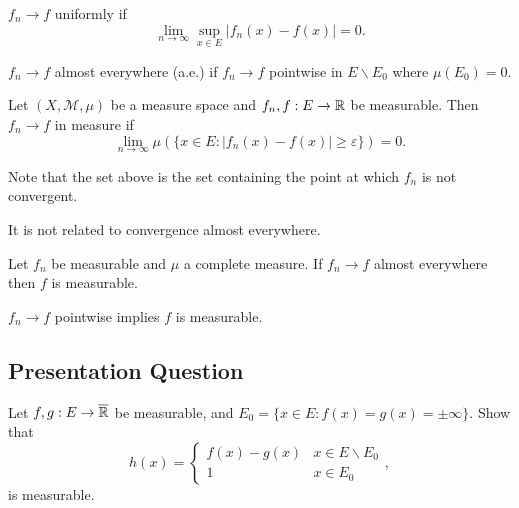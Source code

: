 \documentclass[class=book, crop=false]{standalone}
\begin{document}
        \begin{definition}
            $f_n \rightarrow f$ uniformly if
            \begin{equation*}
                \lim_{n \rightarrow \infty} \sup_{x \in E} |f_n(x) - f(x)| = 0.
            \end{equation*}
        \end{definition}

        \begin{definition}
            $f_n \rightarrow f$ almost everywhere (a.e.) if $f_n \rightarrow f$ pointwise in $E \backslash E_0$ where $\mu(E_0) = 0$.
        \end{definition}

        \begin{definition}
            Let $(X, \mathcal{M}, \mu)$ be a measure space and $f_n, f : E \rightarrow \mathbb{R}$ be measurable. Then $f_n \rightarrow f$ in measure if
            \begin{equation*}
                \lim_{n \rightarrow \infty} \mu(\{x \in E : |f_n(x) - f(x)| \geq \varepsilon\}) = 0.
            \end{equation*}
        \end{definition}
        \begin{remark}
            Note that the set above is the set containing the point at which $f_n$ is not convergent.
        \end{remark}
        \begin{remark}
            It is not related to convergence almost everywhere.
        \end{remark}

        \begin{theorem}
            Let $f_n$ be measurable and $\mu$ a complete measure. If $f_n \rightarrow f$ almost everywhere then $f$ is measurable.
        \end{theorem}
        \begin{corollary}
            $f_n \rightarrow f$ pointwise implies $f$ is measurable.
        \end{corollary}
        
        \subsection{Presentation Question}
        \begin{question}
            Let $f, g : E \rightarrow \overline{\mathbb{R}}$ be measurable, and $E_0 = \{x \in E : f(x) = g(x) = \pm\infty\}$. Show that
            \begin{equation*}
                h(x) = \begin{cases}
                    f(x) - g(x) & x \in E \backslash E_0 \\
                    1 & x \in E_0
                \end{cases},
            \end{equation*}
            is measurable.
        \end{question}
\end{document}
